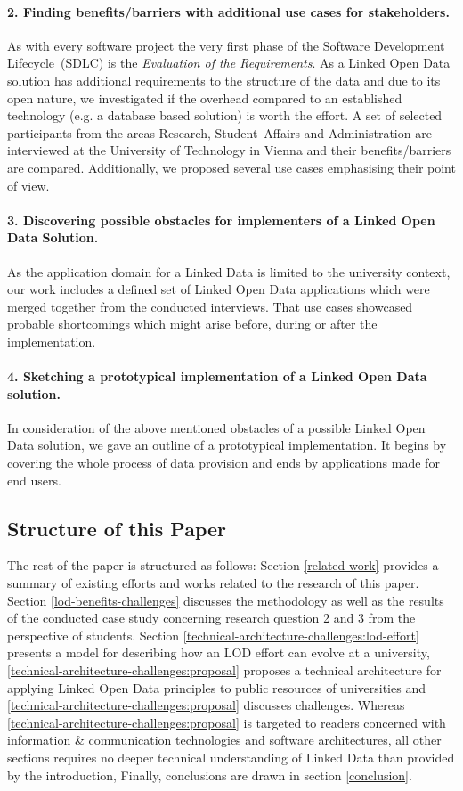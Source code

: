 \documentclass{article}
\begin{document}
\paragraph{2. Finding benefits/barriers with additional use cases for stakeholders.}
As with every software project the very first phase of the Software Development Lifecycle~(SDLC) is the \textit{Evaluation of the Requirements}. As a Linked Open Data solution has additional requirements to the structure of the data and due to its open nature, we investigated if the overhead compared to an established technology (e.g. a database based solution) is worth the effort. A set of selected participants from the areas Research, Student~Affairs and Administration are interviewed at the University of Technology in Vienna and their benefits/barriers are compared. Additionally, we proposed several use cases emphasising their point of view. 
\paragraph{3. Discovering possible obstacles for implementers of a Linked Open Data Solution.}
As the application domain for a Linked Data is limited to the university context, our work includes a defined set of Linked Open Data applications which were merged together from the conducted interviews. That use cases showcased probable shortcomings which might arise before, during or after the implementation.
\paragraph{4. Sketching a prototypical implementation of a Linked Open Data solution.}
In consideration of the above mentioned obstacles of a possible Linked Open Data solution, we gave an outline of a prototypical implementation. It begins by covering the whole process of data provision and ends by applications made for end users. 
\subsection{Structure of this Paper}
The rest of the paper is structured as follows: Section \ref{related-work} provides a summary of existing efforts and works related to the research of this paper. Section \ref{lod-benefits-challenges} discusses the methodology as well as the results of the conducted case study concerning research question 2 and 3 from the perspective of students. Section \ref{technical-architecture-challenges:lod-effort} presents a model for describing how an LOD effort can evolve at a university, \ref{technical-architecture-challenges:proposal} proposes a technical architecture for applying Linked Open Data principles to public resources of universities and \ref{technical-architecture-challenges:proposal} discusses challenges. Whereas \ref{technical-architecture-challenges:proposal} is targeted to readers concerned with information \& communication technologies and software architectures, all other sections requires no deeper technical understanding of Linked Data than provided by the introduction, 
Finally, conclusions are drawn in section \ref{conclusion}.
\end{document}
